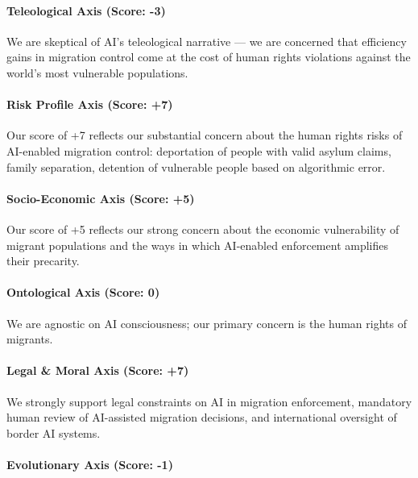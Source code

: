 \paragraph{Teleological Axis (Score:
-3)}\label{teleological-axis-score--3-2}

We are skeptical of AI's teleological narrative --- we are concerned
that efficiency gains in migration control come at the cost of human
rights violations against the world's most vulnerable populations.

\paragraph{Risk Profile Axis (Score:
+7)}\label{risk-profile-axis-score-7-6}

Our score of +7 reflects our substantial concern about the human rights
risks of AI-enabled migration control: deportation of people with valid
asylum claims, family separation, detention of vulnerable people based
on algorithmic error.

\paragraph{Socio-Economic Axis (Score:
+5)}\label{socio-economic-axis-score-5-2}

Our score of +5 reflects our strong concern about the economic
vulnerability of migrant populations and the ways in which AI-enabled
enforcement amplifies their precarity.

\paragraph{Ontological Axis (Score:
0)}\label{ontological-axis-score-0-21}

We are agnostic on AI consciousness; our primary concern is the human
rights of migrants.

\paragraph{Legal \& Moral Axis (Score:
+7)}\label{legal-moral-axis-score-7-6}

We strongly support legal constraints on AI in migration enforcement,
mandatory human review of AI-assisted migration decisions, and
international oversight of border AI systems.

\paragraph{Evolutionary Axis (Score:
-1)}\label{evolutionary-axis-score--1-8}

